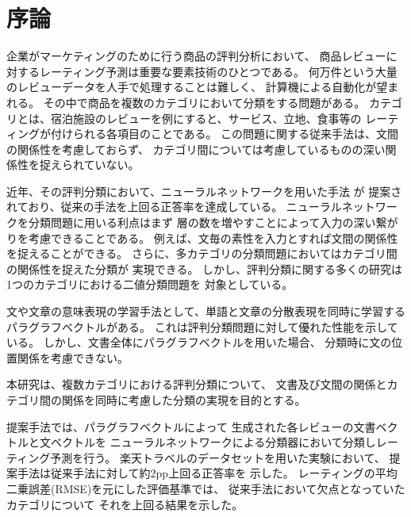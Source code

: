 \section{序論}

企業がマーケティングのために行う商品の評判分析において、
商品レビューに対するレーティング予測は重要な要素技術のひとつである。
何万件という大量のレビューデータを人手で処理することは難しく、
計算機による自動化が望まれる。
その中で商品を複数のカテゴリにおいて分類をする問題がある。
カテゴリとは、宿泊施設のレビューを例にすると、サービス、立地、食事等の
レーティングが付けられる各項目のことである。
この問題に関する従来手法\cite{fujitani15}は、文間の関係性を考慮しておらず、
カテゴリ間については考慮しているものの深い関係性を捉えられていない。

近年、その評判分類において、ニューラルネットワークを用いた手法
\cite{nal14,rie14,duyu15}が
提案されており、従来の手法を上回る正答率を達成している。
ニューラルネットワークを分類問題に用いる利点はまず
層の数を増やすことによって入力の深い繋がりを考慮できることである。
例えば、文毎の素性を入力とすれば文間の関係性を捉えることができる。
さらに、多カテゴリの分類問題においてはカテゴリ間の関係性を捉えた分類が
実現できる。
しかし、評判分類に関する多くの研究は1つのカテゴリにおける二値分類問題を
対象としている。

文や文章の意味表現の学習手法として、単語と文章の分散表現を同時に学習する
パラグラフベクトル\cite{quoc14}がある。
これは評判分類問題に対して優れた性能を示している。
しかし、文書全体にパラグラフベクトルを用いた場合、
分類時に文の位置関係を考慮できない。

本研究は、複数カテゴリにおける評判分類について、
文書及び文間の関係とカテゴリ間の関係を同時に考慮した分類の実現を目的とする。

提案手法では、パラグラフベクトル\cite{quoc14}によって
生成された各レビューの文書ベクトルと文ベクトルを
ニューラルネットワークによる分類器において分類しレーティング予測を行う。
楽天トラベルのデータセットを用いた実験において、
提案手法は従来手法\cite{fujitani15}に対して約2pp上回る正答率を
示した。
レーティングの平均二乗誤差(RMSE)を元にした評価基準では、
従来手法\cite{fujitani15}において欠点となっていたカテゴリについて
それを上回る結果を示した。
